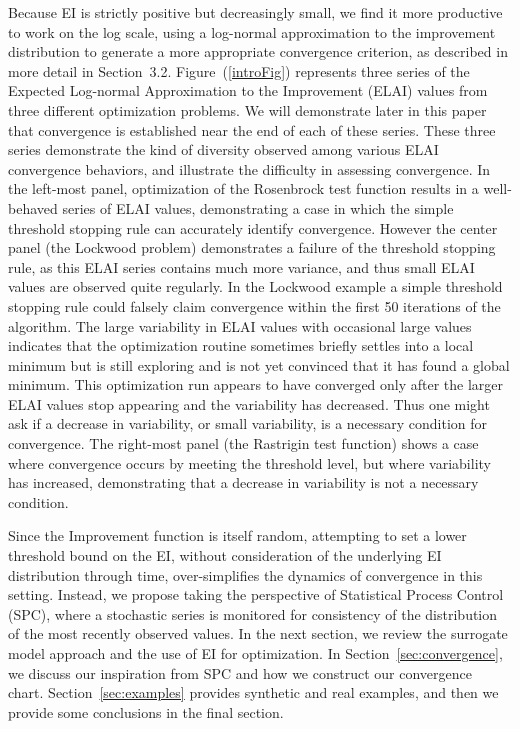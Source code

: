 \documentclass{article}
\begin{document}
Because EI is strictly positive but decreasingly small, we find it more 
productive to work on the log scale, using a log-normal approximation to the 
improvement distribution to generate a more appropriate convergence criterion, 
as described in more detail in Section~3.2. Figure~(\ref{introFig}) represents 
three series of the Expected Log-normal Approximation to the Improvement (ELAI) 
values from three different optimization problems. We will demonstrate later 
in this paper that convergence is established near the end of each of these 
series. These three series demonstrate the kind of diversity observed among 
various ELAI convergence behaviors, and illustrate the difficulty in assessing 
convergence. In the left-most panel, optimization of the Rosenbrock test 
function results in a well-behaved series of ELAI values, demonstrating a case 
in which the simple threshold stopping rule can accurately identify convergence. 
However the center panel (the Lockwood problem) demonstrates a failure of the 
threshold stopping rule, as this ELAI series contains much more variance, and 
thus small ELAI values are observed quite regularly. In the Lockwood example a 
simple threshold stopping rule could falsely claim convergence within the first 
50 iterations of the algorithm. The large variability in ELAI values with 
occasional large values indicates that the optimization routine sometimes 
briefly settles into a local minimum but is still exploring and is not yet 
convinced that it has found a global minimum. This optimization run appears to 
have converged only after the larger ELAI values stop appearing and the 
variability has decreased. Thus one might ask if a decrease in variability, or 
small variability, is a necessary condition for convergence. The right-most 
panel (the Rastrigin test function) shows a case where convergence occurs by 
meeting the threshold level, but where variability has increased, demonstrating 
that a decrease in variability is not a necessary condition. 

%
%

%
Since the Improvement function is itself random, attempting to set a lower 
threshold bound on the EI, without consideration of the underlying EI 
distribution through time, over-simplifies the dynamics of convergence in this 
setting. Instead, we propose taking the perspective of Statistical Process 
Control (SPC), where a stochastic series is monitored for consistency of the 
distribution of the most recently observed values. In the next section, we 
review the surrogate model approach and the use of EI for 
optimization. In Section~\ref{sec:convergence}, we discuss our inspiration from 
SPC and how we construct our convergence chart. Section~\ref{sec:examples} 
provides synthetic and real examples, and then we provide some conclusions in 
the final section. 
\end{document}
